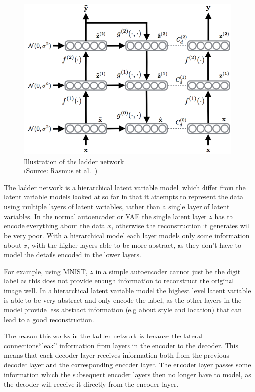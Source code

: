 \begin{figure}[H]
  \centering
  \includegraphics[scale=0.25]{figs/ladder.png}
  \caption[Illustration of the ladder network]{Illustration of the ladder network \\ (Source: Rasmus et al.~\cite{DBLP:journals/corr/RasmusVHBR15})}
  \label{fig:ladder}
\end{figure}

The ladder network is a hierarchical latent variable model, which differ from the latent variable models
looked at so far in that it attempts to represent the data using multiple layers of latent variables, rather than a 
single layer of latent variables. 
In the normal autoencoder or VAE the single latent layer $z$ has to encode everything about the data $x$, otherwise the reconstruction it generates 
will be very poor. With a hierarchical model each layer models only some information about $x$, with the higher layers able to be 
more abstract, 
as they don't have to model the details encoded in the lower layers. 

For example, using MNIST, $z$ in a simple
autoencoder cannot just be the digit label as this does not provide enough information to reconstruct the original image well. 
In a hierarchical latent variable model the highest
level latent variable is able to be very abstract and only encode the label, as the other layers in the model provide less abstract 
information (e.g about style and location) that can lead to a good reconstruction.

The reason this works in the ladder network is because the lateral connections``leak'' information from layers in the encoder to the decoder. 
This means that each decoder layer
receives information both from the previous decoder layer and the corresponding encoder layer. The encoder layer passes some information which
the subsequent encoder layers then no longer have to model, as the decoder will receive it directly from the encoder layer.

